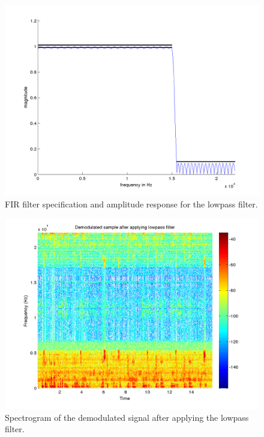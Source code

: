 \begin{figure}
  \begin{center}
    \hspace*{-1in}
    \includegraphics[width=180mm]{q1_fir_filter_specification}
    \caption{FIR filter specification and amplitude response for the
    lowpass filter. \label{fig:q1_fir_filter_specification}}
  \end{center}  
\end{figure}

\begin{figure}
  \begin{center}
    \hspace*{-1in}
    \includegraphics[width=180mm]{q1_demodulated_filtered_spectrogram}
    \caption{Spectrogram of the demodulated signal after applying the
    lowpass filter. 
      \label{fig:q1_demodulated_filtered_spectrogram}}
  \end{center}  
\end{figure}

